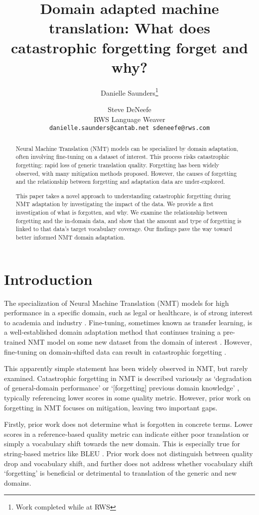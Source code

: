 \documentclass[11pt]{article}
\title{Domain adapted machine translation: What does catastrophic forgetting forget and why?}
\author{Danielle Saunders\thanks{ \hspace*{0.5em}Work completed while at RWS} \and Steve DeNeefe \\
    RWS Language Weaver  \\
      {\tt danielle.saunders@cantab.net\hspace*{0.5em} 
     \hspace*{0.5em} sdeneefe@rws.com}}
\begin{document}
\maketitle
\begin{abstract}
Neural Machine Translation (NMT) models can be specialized by domain adaptation, often involving fine-tuning on a dataset of interest. This process risks catastrophic forgetting: rapid loss of generic translation quality. Forgetting has been widely observed, with many mitigation methods proposed. However, the causes of forgetting and the relationship between forgetting and adaptation data are under-explored. 

This paper takes a novel approach to understanding catastrophic forgetting during NMT adaptation by investigating the impact of the data. We provide a first investigation of what is forgotten, and why. We examine the relationship between forgetting and the in-domain data, and show that the amount and type of forgetting is linked to that data's target vocabulary coverage. Our findings pave the way toward better informed NMT domain adaptation. 
\end{abstract}

\section{Introduction}

The specialization of Neural Machine Translation (NMT) models for high performance in a specific domain, such as legal or healthcare, is of strong interest to academia \cite{barrault-etal-2020-findings-first} and industry \cite{savenkov-lopez-2022-state}. Fine-tuning, sometimes known as transfer learning, is a well-established domain adaptation method that continues training a pre-trained NMT model on some new dataset from the domain of interest \cite{luong2015stanford}.  However, fine-tuning on domain-shifted data can result in catastrophic forgetting \cite{mccloskey1989catastrophic}. 

This apparently simple statement has been widely observed in NMT, but rarely examined. Catastrophic forgetting in NMT is described variously as `degradation of general-domain performance' \cite{thompson-etal-2019-overcoming} or `[forgetting] previous domain knowledge' \cite{gu-feng-2020-investigating},  typically referencing lower scores in some quality metric. However, prior work on forgetting in NMT focuses on mitigation, leaving two important gaps.

Firstly, prior work does not determine what is forgotten in concrete terms. Lower scores in a reference-based quality metric can indicate either poor translation  or simply a vocabulary shift towards the new domain. This is especially true for string-based metrics like BLEU \cite{papineni-etal-2002-bleu}. Prior work does not distinguish between quality drop and vocabulary shift, and further does not address whether vocabulary shift `forgetting' is beneficial or detrimental to translation of the generic and new domains. 
\end{document}
